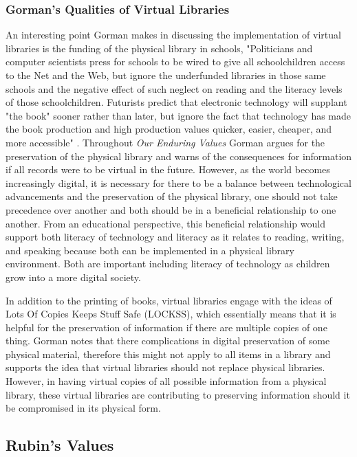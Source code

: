 \subsubsection{Gorman's Qualities of Virtual Libraries}

An interesting point Gorman makes in discussing the implementation of virtual libraries is the funding of the physical library in schools, "Politicians and computer scientists press for schools to be wired to give all schoolchildren access to the Net and the Web, but ignore the underfunded libraries in those same schools and the negative effect of such neglect on reading and the literacy levels of those schoolchildren. Futurists predict that electronic technology will supplant "the book" sooner rather than later, but ignore the fact that technology has made the book production and high production values quicker, easier, cheaper, and more accessible" \cite{gorman2000values}. Throughout \textit{Our Enduring Values} Gorman argues for the preservation of the physical library and warns of the consequences for information if all records were to be virtual in the future. However, as the world becomes increasingly digital, it is necessary for there to be a balance between technological advancements and the preservation of the physical library, one should not take precedence over another and both should be in a beneficial relationship to one another. From an educational perspective, this beneficial relationship would support both literacy of technology and literacy as it relates to reading, writing, and speaking because both can be implemented in a physical library environment. Both are important including literacy of technology as children grow into a more digital society. 

In addition to the printing of books, virtual libraries engage with the ideas of Lots Of Copies Keeps Stuff Safe (LOCKSS), which essentially means that it is helpful for the preservation of information if there are multiple copies of one thing. Gorman notes that there complications in digital preservation of some physical material, therefore this might not apply to all items in a library and supports the idea that virtual libraries should not replace physical libraries. However, in having virtual copies of all possible information from a physical library, these virtual libraries are contributing to preserving information should it be compromised in its physical form. 

\subsection{Rubin's Values}


